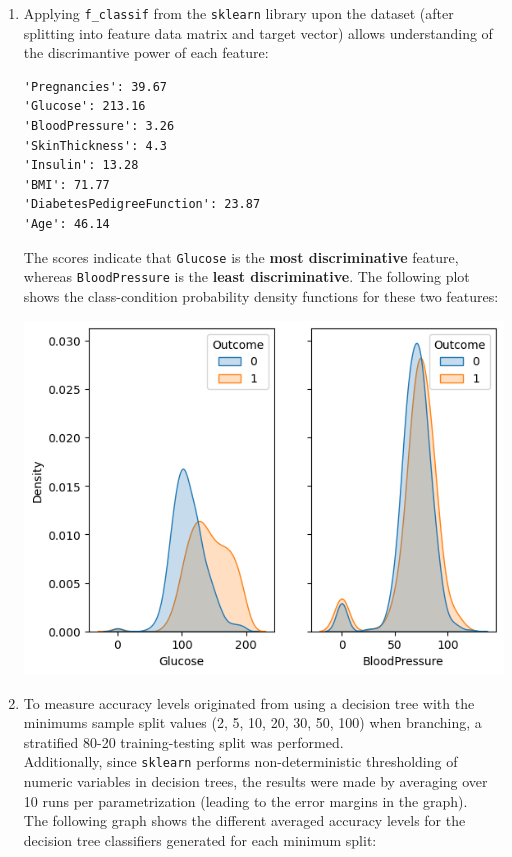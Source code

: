 \documentclass[12pt]{article}
\begin{document}
\begin{enumerate}[leftmargin=\labelsep, label=\textbf{\arabic*.)}]
    \item Applying \texttt{f\_classif} from the \texttt{sklearn} library upon the dataset (after splitting into feature data matrix and target vector) allows understanding of the discrimantive power of each feature: \vskip 0.25cm
          \begin{lstlisting}[basicstyle=\ttfamily\centering]
'Pregnancies': 39.67
'Glucose': 213.16
'BloodPressure': 3.26
'SkinThickness': 4.3
'Insulin': 13.28
'BMI': 71.77
'DiabetesPedigreeFunction': 23.87
'Age': 46.14
        \end{lstlisting}
          The scores indicate that \texttt{Glucose} is the \textbf{most discriminative} feature, whereas \texttt{BloodPressure} is the \textbf{least discriminative}.
          The following plot shows the class-condition probability density functions for these two features:\vskip 0.25cm
          \begin{center}
              \includegraphics{discrimantive_features_dense_probability.png}
          \end{center}
    \item To measure accuracy levels originated from using a decision tree with the minimums sample split values (2, 5, 10, 20, 30, 50, 100) when branching, a stratified 80-20 training-testing split was performed. \\ \vspace{0.25em} Additionally, since \texttt{sklearn} performs non-deterministic thresholding of numeric variables in decision trees, the results were made by averaging over 10 runs per parametrization (leading to the error margins in the graph). \\ \vspace{0.25em} The following graph shows the different averaged accuracy levels for the decision tree classifiers generated for each minimum split: \\

\end{enumerate}
\end{document}
